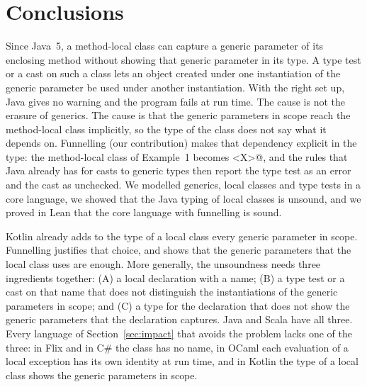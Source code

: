 \section{Conclusions}
\label{sec:conclusions}
Since Java~5, a method-local class can capture a generic parameter of its enclosing method without showing that generic parameter in its type.
A type test or a cast on such a class lets an object created under one instantiation of the generic parameter be used under another instantiation.
With the right set up, Java gives no warning and the program fails at run time.
The cause is not the erasure of generics.
The cause is that the generic parameters in scope reach the method-local class implicitly, so the type of the class does not say what it depends on.
Funnelling (our contribution) makes that dependency explicit in the type: the method-local class \Q@MyFoo@ of Example~1 becomes \Q@MyFoo<X>@, and the rules that Java already has for casts to generic types then report the type test as an error and the cast as unchecked.
We modelled generics, local classes and type tests in a core language, we showed that the Java typing of local classes is unsound, and we proved in Lean that the core language with funnelling is sound.

Kotlin already adds to the type of a local class every generic parameter in scope.
Funnelling justifies that choice, and shows that the generic parameters that the local class uses are enough.
More generally, the unsoundness needs three ingredients together:
(A) a local declaration with a name;
(B) a type test or a cast on that name that does not distinguish the instantiations of the generic parameters in scope;
and (C) a type for the declaration that does not show the generic parameters that the declaration captures.
Java and Scala have all three.
Every language of Section~\ref{sec:impact} that avoids the problem lacks one of the three:
in Flix and in C\# the class has no name, in OCaml each evaluation of a local exception has its own identity at run time, and in Kotlin the type of a local class shows the generic parameters in scope.
